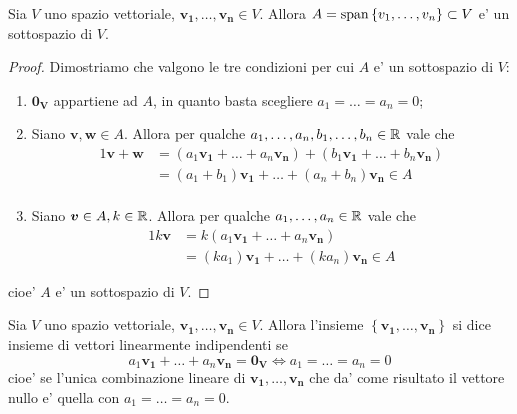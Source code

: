 \begin{proposition}
    Sia $V$ uno spazio vettoriale, $\bm{v_1}, \dots, \bm{v_n} \in V$. Allora $A = \operatorname{span}\left\{v_1, \dots, v_n\right\} \subset V$ e' un sottospazio di $V$.
\end{proposition}
\begin{proof}
    Dimostriamo che valgono le tre condizioni per cui $A$ e' un sottospazio di $V$:
    \begin{enumerate}
        \item $\bm{0_V}$ appartiene ad $A$, in quanto basta scegliere $a_1 = \dots = a_n = 0$;
        \item Siano $\bm{v}, \bm{w} \in A$. Allora per qualche $a_1, \dots, a_n, b_1, \dots, b_n \in \mathbb{R}$ vale che \begin{alignat*}{1}
            \bm{v} + \bm{w} &= (a_1\bm{v_1} + \dots + a_n\bm{v_n}) + (b_1\bm{v_1} + \dots + b_n\bm{v_n}) \\
            &= (a_1 + b_1)\bm{v_1} + \dots + (a_n + b_n)\bm{v_n} \in A\\
        \end{alignat*}
        \item Siano $\bm{v} \in A, k \in \mathbb{R}$. Allora per qualche $a_1, \dots, a_n \in \mathbb{R}$ vale che \begin{alignat*}{1}
            k\bm{v} &= k(a_1\bm{v_1} + \dots + a_n\bm{v_n})  \\
            &= (ka_1)\bm{v_1} + \dots + (ka_n)\bm{v_n} \in A
        \end{alignat*}
    \end{enumerate}
    cioe' $A$ e' un sottospazio di $V$.
\end{proof}

\begin{definition}
    Sia $V$ uno spazio vettoriale, $\bm{v_1}, \dots, \bm{v_n} \in V$. Allora l'insieme $\left\{ \bm{v_1}, \dots, \bm{v_n} \right\}$ si dice insieme di vettori linearmente indipendenti se
    \begin{equation}
        a_1\bm{v_1} + \dots + a_n\bm{v_n} = \bm{0_V} \iff a_1 = \dots = a_n = 0
    \end{equation}
    cioe' se l'unica combinazione lineare di $\bm{v_1}, \dots, \bm{v_n}$ che da' come risultato il vettore nullo e' quella con $a_1 = \dots = a_n = 0$.
\end{definition}

